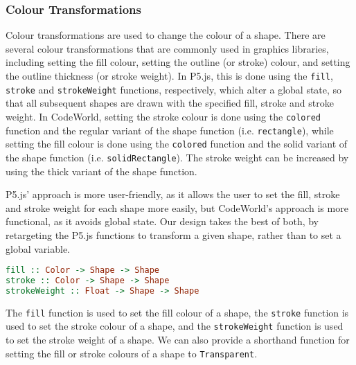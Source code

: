 \documentclass[../main.tex]{subfiles}
\begin{document}
            \subsubsection{Colour Transformations}
                Colour transformations are used to change the colour of a shape.
                There are several colour transformations that are commonly used in graphics
                    libraries, including setting the fill colour, setting the outline (or stroke)
                    colour, and setting the outline thickness (or stroke weight).
                In P5.js, this is done using the \texttt{fill}, \texttt{stroke} and
                    \texttt{strokeWeight} functions, respectively, which alter a global state, so
                    that all subsequent shapes are drawn with the specified fill, stroke and stroke
                    weight.
                In CodeWorld, setting the stroke colour is done using the \texttt{colored}
                    function and the regular variant of the shape function (i.e.
                    \texttt{rectangle}), while setting the fill colour is done using the
                    \texttt{colored} function and the solid variant of the shape function (i.e.
                    \texttt{solidRectangle}).
                The stroke weight can be increased by using the thick variant of the shape
                    function.

                P5.js' approach is more user-friendly, as it allows the user to set the fill,
                    stroke and stroke weight for each shape more easily, but CodeWorld's approach
                    is more functional, as it avoids global state.
                Our design takes the best of both, by retargeting the P5.js functions to
                    transform a given shape, rather than to set a global variable.

                \begin{lstlisting}[language={Haskell}, label={lst:colour}, caption={The colour transformation 
                    functions.}]
fill :: Color -> Shape -> Shape
stroke :: Color -> Shape -> Shape
strokeWeight :: Float -> Shape -> Shape\end{lstlisting}

                The \texttt{fill} function is used to set the fill colour of a shape, the
                    \texttt{stroke} function is used to set the stroke colour of a shape, and the
                    \texttt{strokeWeight} function is used to set the stroke weight of a shape.
                We can also provide a shorthand function for setting the fill or stroke colours
                    of a shape to \texttt{Transparent}.
\end{document}
